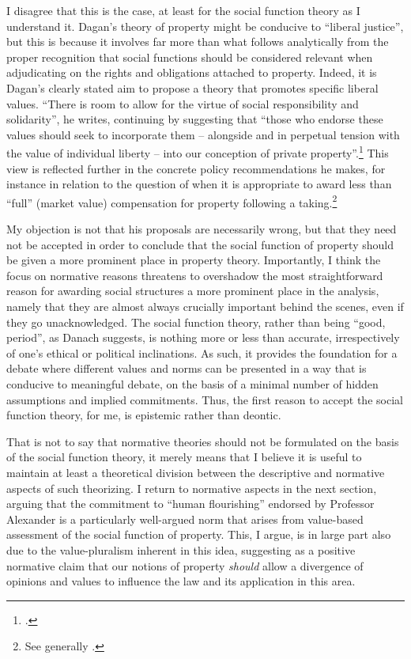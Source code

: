I disagree that this is the case, at least for the social function theory as I understand it. Dagan's theory of property might be conducive to ``liberal justice'', but this is because it involves far more than what follows analytically from the proper recognition that  social functions should be considered relevant when adjudicating on the rights and obligations attached to property. Indeed, it is Dagan's clearly stated aim to propose a theory that promotes specific liberal values. ``There is room to allow for the virtue of social responsibility and solidarity'', he writes, continuing by suggesting that ``those who endorse these values should seek to incorporate them -- alongside and in perpetual tension with the value of individual liberty -- into our conception of private property''.\footcite[802]{dagan99} This view is reflected further in the concrete policy recommendations he makes, for instance in relation to the question of when it is appropriate to award less than ``full'' (market value) compensation for property following a taking.\footnote{See generally \cite{dagan14b}.}

My objection is not that his proposals are necessarily wrong, but that they need not be accepted in order to conclude that the social function of property should be given a more prominent place in property theory. Importantly, I think the focus on normative reasons threatens to overshadow the most straightforward reason for awarding social structures a more prominent place in the analysis, namely that they are almost always crucially important behind the scenes, even if they go unacknowledged. The social function theory, rather than being ``good, period'', as Danach suggests, is nothing more or less than accurate, irrespectively of one's ethical or political inclinations. As such, it provides the foundation for a debate where different values and norms can be presented in a way that is conducive to meaningful debate, on the basis of a minimal number of hidden assumptions and implied commitments. Thus, the first reason to accept the social function theory, for me, is epistemic rather than deontic.

That is not to say that normative theories should not be formulated on the basis of the social function theory, it merely means that I believe it is useful to maintain at least a theoretical division between the descriptive and normative aspects of such theorizing. I return to normative aspects in the next section, arguing that the commitment to ``human flourishing'' endorsed by Professor Alexander is a particularly well-argued norm that arises from value-based assessment of the social function of property. This, I argue, is in large part also due to the value-pluralism inherent in this idea, suggesting as a positive normative claim that our notions of property {\it should} allow a divergence of opinions and values to influence the law and its application in this area.

